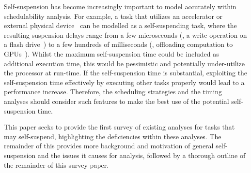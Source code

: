 Self-suspension has become increasingly important to model accurately within schedulability analysis. For example, a task that utilizes an accelerator or external physical device~\cite{Kang:rtss07,Kato_2011} can be modelled as a self-suspending task, where the resulting suspension delays range from a few microseconds (\eg, a write operation on a flash drive~\cite{Kang:rtss07}) to a few hundreds of milliseconds (\eg, offloading computation to GPUs~\cite{Kato_2011,Liu_2014}).  Whilst the maximum self-suspension time could be included as additional execution time, this would be pessimistic and potentially under-utilize the processor at run-time. If the self-suspension time is substantial, exploiting the self-suspension time effectively by executing other tasks properly would lead to a performance increase. Therefore, the scheduling strategies and the timing analyses should consider such features to make the best use of the potential self-suspension time.

This paper seeks to provide the first survey of existing analyses for tasks that may self-suspend, highlighting the deficiencies within these analyses. The remainder of this \mysectionrefnormal{} provides more background and motivation of general self-suspension and the issues it causes for analysis, followed by a thorough outline of the remainder of this survey paper.




